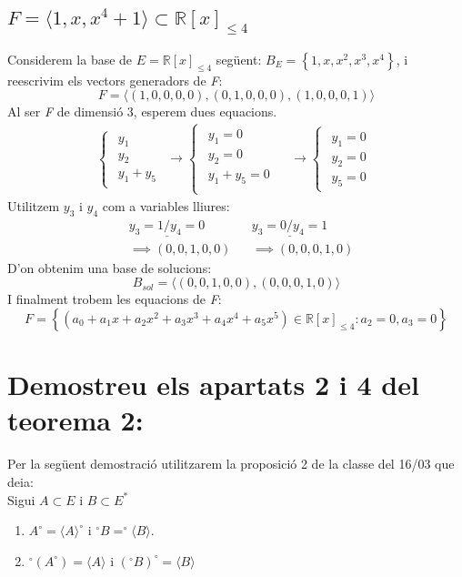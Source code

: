 \documentclass[a4paper, 11pt]{article}
\newcommand{\Bca}{\begin{cases}\begin{aligned}}
\newcommand{\Eca}{\end{aligned}\end{cases}}
\begin{document}
    \subsection{$ F = \langle 1, x, x^4+1 \rangle \subset \mathbb{R}[x]_{\leq 4} $}
    Considerem la base de $ E = \mathbb{R}[x]_{\leq 4} $ seg\"uent: $B_E = \left\{ 1,x,x^2,x^3,x^4 \right\}$, i reescrivim els vectors generadors de \emph{F}:
    $$
        F = \langle (1, 0,0,0,0), (0,1,0,0,0),(1,0,0,0,1) \rangle
    $$
    Al ser \emph{F} de dimensi\'o 3, esperem dues equacions.
    \begin{gather*}
        \Bca
            y_1\\
            y_2\\
            y_1 + y_5
        \Eca \longrightarrow
        \Bca
            y_1 = 0&\\
            y_2 = 0&\\
            y_1 + y_5 = 0&\\
        \Eca \longrightarrow
        \Bca
            y_1 = 0\\
            y_2 = 0\\
            y_5 = 0
        \Eca
    \end{gather*}
    Utilitzem $y_3$ i $y_4$ com a variables lliures:
    \begin{align*}
        &\underline{y_3 = 1 / y_4 = 0} & &\underline{y_3 = 0 / y_4 = 1}\\
        &\implies (0, 0, 1, 0, 0) & & \implies (0, 0, 0, 1, 0)
    \end{align*}
    D'on obtenim una base de solucions:
    $$
        B_{sol} = \langle (0, 0, 1, 0, 0), (0, 0, 0, 1, 0) \rangle
    $$
    I finalment trobem les equacions de \emph{F}:
    $$
        F = \left\{ (a_0+a_1x+a_2x^2+a_3x^3+a_4x^4+a_5x^5) \in \mathbb{R}[x]_{\leq 4} : a_2 = 0, a_3 = 0 \right\}
    $$

    \section{Demostreu els apartats 2 i 4 del teorema 2:}
    Per la seg\"uent demostraci\'o utilitzarem la proposici\'o 2 de la classe del 16/03 que deia:\\
    Sigui $A \subset E$ i $B \subset E^*$
    \begin{enumerate}
        \item $A^\circ = \langle A \rangle ^\circ \text{ i } ^\circ B = ^\circ \langle B \rangle$.
        \item $^\circ (A^\circ) = \langle A \rangle \text{ i } (^\circ B)^\circ = \langle B \rangle$
    \end{enumerate}
\end{document}
